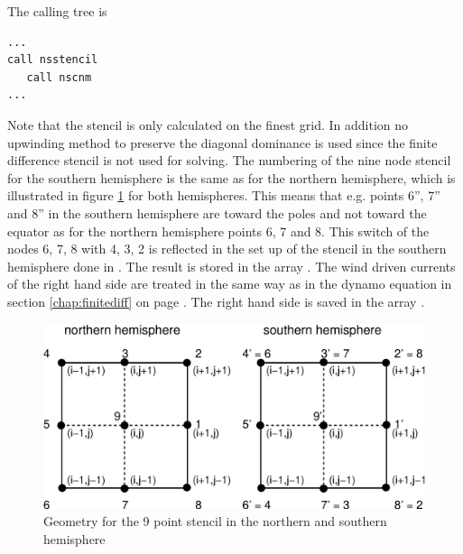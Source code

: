 The calling tree is 
%
\begin{verbatim}
...
call nsstencil
   call nscnm
...
\end{verbatim}
%
Note that the stencil is only calculated on the finest grid. In addition
no  upwinding method to preserve the diagonal dominance is used  
since the finite difference stencil is not used for solving. The numbering
 of the nine node stencil for the
southern hemisphere is the same as for the northern hemisphere, which is illustrated in 
 figure \ref{fig:nsstencil} for both hemispheres. This means that e.g. points 6'', 7'' and 8'' 
in the southern hemisphere are toward the poles and not toward the equator as for the northern hemisphere
points 6, 7 and 8.
This switch of the nodes 6, 7, 8 with 4, 3, 2 is reflected in the set up
of the stencil in the southern hemisphere done in .
The result is stored in the array . The wind driven currents
of the right hand side are treated in the same way as in the dynamo
equation in section  \ref{chap:finitediff} on page \pageref{page:finite_rhs}.
The right hand side is saved in the array .
 \\
 
%
\begin{figure}
  \centering
  \includegraphics[scale=0.5]{./tex_plot/ns_stencil.eps}
  \caption{Geometry for the 9 point stencil in the northern and southern hemisphere}
   \label{fig:nsstencil}
\end{figure}
%

